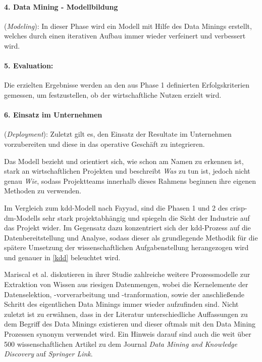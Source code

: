 \paragraph{4. Data Mining - Modellbildung}(\textit{Modeling}): 
In dieser Phase wird ein Modell mit Hilfe des Data Minings erstellt, welches durch einen iterativen Aufbau immer wieder verfeinert und verbessert wird. 
\paragraph{5. Evaluation:}
Die erzielten Ergebnisse werden an den aus Phase 1 definierten Erfolgskriterien gemessen, um festzustellen, ob der wirtschaftliche Nutzen erzielt wird.
\paragraph{6. Einsatz im Unternehmen}(\textit{Deployment}): 
Zuletzt gilt es, den Einsatz der Resultate im Unternehmen vorzubereiten und diese in das operative Geschäft zu integrieren.

Das Modell bezieht und orientiert sich, wie schon am Namen zu erkennen ist, stark an wirtschaftlichen Projekten und beschreibt \textit{Was} zu tun ist, jedoch nicht genau \textit{Wie}, sodass Projektteams innerhalb dieses Rahmens beginnen ihre eigenen Methoden zu verwenden.

Im Vergleich zum \gls{kdd}-Modell nach Fayyad, sind die Phasen 1 und 2 des \gls{crisp-dm}-Modells sehr stark projektabhängig und spiegeln die Sicht der Industrie auf das Projekt wider. Im Gegensatz dazu konzentriert sich der \gls{kdd}-Prozess auf die Datenbereitstellung und Analyse, sodass dieser als grundlegende Methodik für die spätere Umsetzung der wissenschaftlichen Aufgabenstellung herangezogen wird und genauer in \vref{kdd} beleuchtet wird.

Mariscal et al. diskutieren in ihrer Studie zahlreiche weitere Prozessmodelle zur Extraktion von Wissen aus riesigen Datenmengen, wobei die Kernelemente der Datenselektion, -vorverarbeitung und -tranformation, sowie der anschließende Schritt des eigentlichen Data Minings immer wieder aufzufinden sind. Nicht zuletzt ist zu erwähnen, dass in der Literatur unterschiedliche Auffassungen zu dem Begriff des Data Minings existieren und dieser oftmals mit den Data Mining Prozessen synonym verwendet wird. Ein Hinweis darauf sind auch die weit über 500 wissenschaftlichen Artikel zu dem Journal \textit{Data Mining and Knowledge Discovery} auf \textit{Springer Link}.

